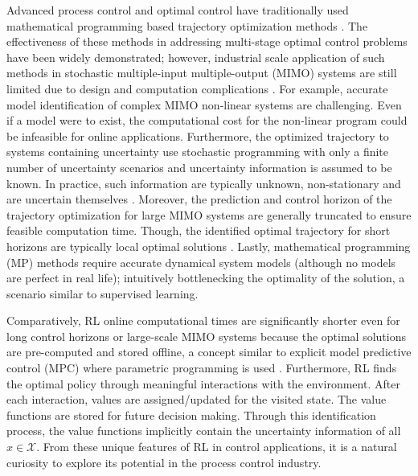%
% 
Advanced process control and optimal control have traditionally used mathematical programming based trajectory optimization methods \cite{empc2, zone_mpc, mpc, empc1,}.  The effectiveness of these methods in addressing multi-stage optimal control problems have been widely demonstrated; however, industrial scale application of such methods in stochastic multiple-input multiple-output (MIMO) systems are still limited due to design and computation complications \cite{MS}. For example, accurate model identification of complex MIMO non-linear systems are challenging. Even if a model were to exist, the computational cost for the non-linear program could be infeasible for online applications. Furthermore, the optimized trajectory to systems containing uncertainty use stochastic programming with only a finite number of uncertainty scenarios and uncertainty information is assumed to be known. In practice, such information are typically unknown, non-stationary and are uncertain themselves \cite{jayCCE}. Moreover, the prediction and control horizon of the trajectory optimization for large MIMO systems are generally truncated to ensure feasible computation time. Though, the identified optimal trajectory for short horizons are typically local optimal solutions \cite{mpc}. Lastly, mathematical programming (MP) methods require accurate dynamical system models (although no models are perfect in real life); intuitively bottlenecking the optimality of the solution, a scenario similar to supervised learning.

Comparatively, RL online computational times are significantly shorter even for long control horizons or large-scale MIMO systems because the optimal solutions are pre-computed and stored offline, a concept similar to explicit model predictive control (MPC) where parametric programming is used \cite{explicit_MPC}. Furthermore, RL finds the optimal policy through meaningful interactions with the environment.  After each interaction, values are assigned/updated for the visited state. The value functions are stored for future decision making.  Through this identification process, the value functions implicitly contain the uncertainty information of all $x \in \mathcal{X}$. From these unique features of RL in control applications, it is a natural curiosity to explore its potential in the process control industry.

